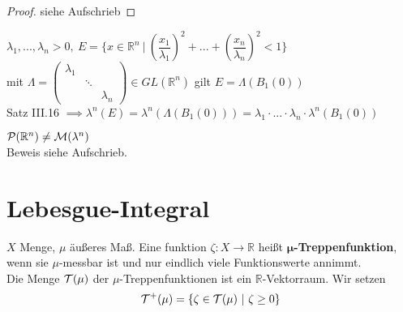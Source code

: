 \documentclass[11pt,a4paper,fleqn,openany]{report}
\begin{document}
    \begin{proof}
      siehe Aufschrieb
    \end{proof}

    \begin{example}
    \begin{minipage}{0.7\textwidth}
      $\lambda_1, ...,  \lambda_n > 0, \ E=\{x \in \mathbb{R}^n \ | \ (\dfrac{x_1}{\lambda_1})^2 + ... + (\dfrac{x_n}{\lambda_n})^2 < 1\}$\\
      mit $\Lambda = \begin{pmatrix}
        \lambda_1 & &\\
        & \ddots &\\
        & & \lambda_n
      \end{pmatrix}
      \in GL(\mathbb{R}^n)$ gilt $E = \Lambda(B_1(0))$\\
      Satz III.16 $\implies \lambda^n(E) = \lambda^n(\Lambda(B_1(0))) = \lambda_1 \cdot ... \cdot \lambda_n \cdot \lambda^n(B_1(0))$
    \end{minipage}\hfill
    \begin{minipage}{0.3\textwidth}
    \end{minipage}
    \end{example}

    \begin{example}[Vitali 1905]
      $\mathcal{P}(\mathbb{R}^n) \neq \mathcal{M}(\lambda^n)$\\
      Beweis siehe Aufschrieb.
    \end{example}

  \chapter{Lebesgue-Integral}
    \begin{definition}
      $X$ Menge, $\mu$ äußeres Maß. Eine funktion $\zeta: X \to \mathbb{R}$ heißt $\bm{\mu}$\textbf{-Treppenfunktion}, wenn sie $\mu$-messbar ist und nur eindlich viele Funktionswerte annimmt.\\
      Die Menge $\mathcal{T}(\mu)$ der $\mu$-Treppenfunktionen ist ein $\mathbb{R}$-Vektorraum. Wir setzen
      \begin{align*}
        \mathcal{T}^+(\mu)=\{\zeta \in \mathcal{T}(\mu) \ | \ \zeta \geq 0\}
      \end{align*}
    \end{definition}
\end{document}
